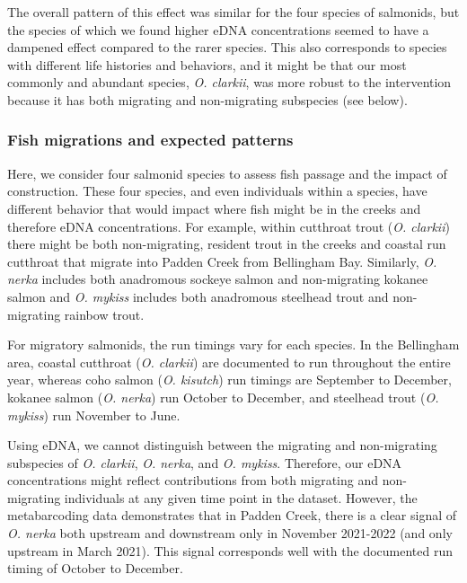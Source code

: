 \documentclass[
]{article}
\begin{document}
The overall pattern of this effect was similar for the four species of
salmonids, but the species of which we found higher eDNA concentrations
seemed to have a dampened effect compared to the rarer species. This
also corresponds to species with different life histories and behaviors,
and it might be that our most commonly and abundant species, \emph{O.
clarkii}, was more robust to the intervention because it has both
migrating and non-migrating subspecies (see below).

\hypertarget{fish-migrations-and-expected-patterns}{%
\subsubsection{Fish migrations and expected
patterns}\label{fish-migrations-and-expected-patterns}}

Here, we consider four salmonid species to assess fish passage and the
impact of construction. These four species, and even individuals within
a species, have different behavior that would impact where fish might be
in the creeks and therefore eDNA concentrations. For example, within
cutthroat trout (\emph{O. clarkii}) there might be both non-migrating,
resident trout in the creeks and coastal run cutthroat that migrate into
Padden Creek from Bellingham Bay. Similarly, \emph{O. nerka} includes
both anadromous sockeye salmon and non-migrating kokanee salmon and
\emph{O. mykiss} includes both anadromous steelhead trout and
non-migrating rainbow trout.

For migratory salmonids, the run timings vary for each species. In the
Bellingham area, coastal cutthroat (\emph{O. clarkii}) are documented to
run throughout the entire year, whereas coho salmon (\emph{O. kisutch})
run timings are September to December, kokanee salmon (\emph{O. nerka})
run October to December, and steelhead trout (\emph{O. mykiss}) run
November to June.

Using eDNA, we cannot distinguish between the migrating and
non-migrating subspecies of \emph{O. clarkii}, \emph{O. nerka}, and
\emph{O. mykiss}. Therefore, our eDNA concentrations might reflect
contributions from both migrating and non-migrating individuals at any
given time point in the dataset. However, the metabarcoding data
demonstrates that in Padden Creek, there is a clear signal of \emph{O.
nerka} both upstream and downstream only in November 2021-2022 (and only
upstream in March 2021). This signal corresponds well with the
documented run timing of October to December.
\end{document}
